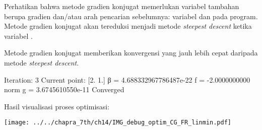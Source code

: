 Perhatikan bahwa metode gradien konjugat memerlukan variabel tambahan berupa
gradien dan/atau arah pencarian sebelumnya: variabel  dan
 pada program. Metode gradien konjugat akan tereduksi menjadi
metode \textit{steepest descent} ketika variabel .

Metode gradien konjugat memberikan konvergensi yang jauh lebih cepat daripada
metode \textit{steepest descent}.
\begin{textcode}
Iteration:  3
Current point:  [2. 1.]
β =  4.688332967786487e-22
f      =      -2.0000000000
norm g =   3.6745610550e-11
Converged
\end{textcode}

Hasil visualisasi proses optimisasi:

{\centering
\texttt{[image: ../../chapra\_7th/ch14/IMG\_debug\_optim\_CG\_FR\_linmin.pdf]}
\par}

